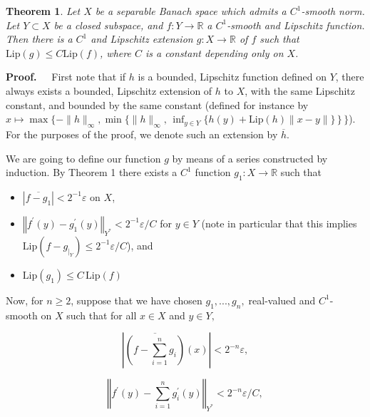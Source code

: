 \documentclass[11pt]{amsproc}%
\theoremstyle{plain}
\newtheorem{theorem}{Theorem}
\numberwithin{equation}{section}
\begin{document}
\medskip

\begin{theorem}
\label{extension theorem} Let $X$ be a separable Banach space which admits a
$C^{1}$-smooth norm. Let $Y\subset X$ be a closed subspace, and
$f:Y\rightarrow\mathbb{R}$ a $C^{1}$-smooth and Lipschitz function. Then there
is a $C^{1}$ and Lipschitz extension $g:X\to\mathbb{R}$ of $f$ such that
$\text{Lip}(g)\leq C\text{Lip}(f)$, where $C$ is a constant depending only on
$X$.
\end{theorem}

\noindent\textbf{Proof.\ \ } First note that if $h$ is a bounded, Lipschitz
function defined on $Y$, there always exists a bounded, Lipschitz extension of
$h$ to $X$, with the same Lipschitz constant, and bounded by the same constant
(defined for instance by $x\mapsto\max\{ -\|h\|_{\infty}, \min\{
\|h\|_{\infty}, \, \inf_{y\in Y}\{ h(y)+\text{Lip}(h)\|x-y\|\}\, \}\, \}$).
For the purposes of the proof, we denote such an extension by $\overline{h}$.

\medskip

\noindent We are going to define our function $g$ by means of a series
constructed by induction. By Theorem 1 there exists a $C^{1}$ function
$g_{1}:X\rightarrow\mathbb{R}$ such that

\begin{itemize}
\item $|\overline{f-g_{1}}|<2^{-1}\varepsilon$ on $X$,

\item $\left\Vert f^{\prime}\left(  y\right)  -g_{1}^{\prime}\left(  y\right)
\right\Vert _{Y^{\ast}}<2^{-1}\varepsilon/C$ for $y\in Y$ (note in particular
that this implies $\text{Lip}(f-g_{|_{Y}})\leq2^{-1}\varepsilon/C$), and

\item $\text{Lip}\left(  g_{1}\right)  \leq C\,\text{Lip}(f)$
\end{itemize}

\medskip

\noindent Now, for $n\geq2$, suppose that we have chosen $g_{1},...,g_{n}%
,\;$real-valued and $C^{1}$-smooth on $X$ such that for all $x\in X$ and $y\in
Y,$

\medskip%

\[
\left\vert \overline{\left(  f-\sum_{i=1}^{n}g_{i}\right)  }\left(  x\right)
\right\vert <2^{-n}\varepsilon,
\]


\medskip%

\[
\left\Vert f^{\prime}\left(  y\right)  -\sum_{i=1}^{n}g_{i}^{\prime}\left(
y\right)  \right\Vert _{Y^{\ast}}<2^{-n}\varepsilon/C,
\]
\end{document}
